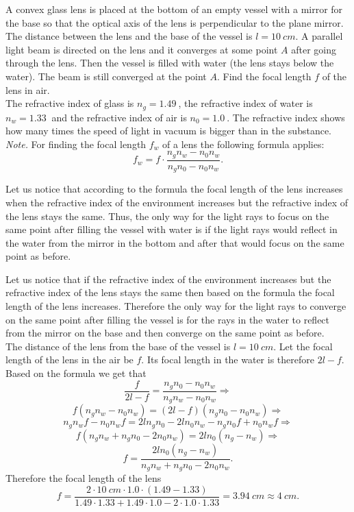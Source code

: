 A convex glass lens is placed at the bottom of an empty vessel with a mirror for the base so that the optical axis of the lens is perpendicular to the plane mirror. The distance between the lens and the base of the vessel is $l=\SI{10}{cm}$. A parallel light beam is directed on the lens and it converges at some point $A$ after going through the lens. Then the vessel is filled with water (the lens stays below the water). The beam is still converged at the point $A$. Find the focal length $f$ of the lens in air. \\
The refractive index of glass is $n_g = \SI{1,49}{}$, the refractive index of water is $n_w = \SI{1,33}{}$ and the refractive index of air is $n_0 = \SI{1,0}{}$. The refractive index shows how many times the speed of light in vacuum is bigger than in the substance. \\
\emph{Note.} For finding the focal length $f_w$ of a lens the following formula applies:
\[ f_w = f\cdot\frac{n_g n_w - n_0 n_w}{n_g n_0 - n_0 n_w}. \]

\hinteng
Let us notice that according to the formula the focal length of the lens increases when the refractive index of the environment increases but the refractive index of the lens stays the same. Thus, the only way for the light rays to focus on the same point after filling the vessel with water is if the light rays would reflect in the water from the mirror in the bottom and after that would focus on the same point as before.

\solueng
Let us notice that if the refractive index of the environment increases but the refractive index of the lens stays the same then based on the formula the focal length of the lens increases. Therefore the only way for the light rays to converge on the same point after filling the vessel is for the rays in the water to reflect from the mirror on the base and then converge on the same point as before.\\
The distance of the lens from the base of the vessel is $l = \SI{10}{cm}$. Let the focal length of the lens in the air be $f$. Its focal length in the water is therefore $2l-f$. Based on the formula we get that
\[ \frac{f}{2l-f} = \frac{n_g n_0 - n_0 n_w}{n_g n_w - n_0 n_w}\Rightarrow \] 
\[ f(n_g n_w - n_0 n_w) = (2l-f)(n_g n_0 - n_0 n_w)\Rightarrow \]
\[ n_g n_w f - n_0 n_w f = 2l n_g n_0 - 2l n_0 n_w - n_g n_0 f + n_0 n_w f\Rightarrow \]
\[ f (n_g n_w + n_g n_0 - 2 n_0 n_w) = 2l n_0 (n_g - n_w)\Rightarrow \]
\[ f = \frac{2l n_0 (n_g - n_w)}{n_g n_w + n_g n_0 - 2 n_0 n_w}. \]
Therefore the focal length of the lens
\[ f = \frac{\num{2} \cdot \SI{10}{cm} \cdot \num{1,0} \cdot (\num{1,49} - \num{1,33})}{\num{1,49}
\cdot \num{1,33} + \num{1,49} \cdot \num{1,0} - \num{2} \cdot \num{1,0} \cdot \num{1,33}} = \SI{3,94}{cm}
\approx \SI{4}{cm}. \]
\probend